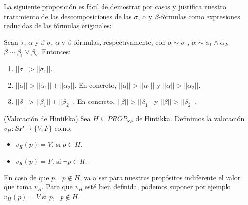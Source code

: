 La siguiente proposición es fácil de demostrar por casos y justifica nuestro tratamiento de las descomposiciones de las $\sigma$, $\alpha$ y $\beta$-fórmulas como expresiones reducidas de las fórmulas originales:

\begin{prop}\label{norma}
Sean $\sigma$, $\alpha$ y $\beta$ $\sigma$, $\alpha$ y $\beta$-fórmulas, respectivamente, con $\sigma \sim \sigma_1$, $\alpha \sim \alpha_1 \land \alpha_2$, $\beta \sim \beta_1 \lor \beta_2$. Entonces:
\begin{enumerate}
    \item $||\sigma|| > ||\sigma_1||$.
    \item $||\alpha|| > ||\alpha_1||+||\alpha_2||$. En concreto, $||\alpha||>||\alpha_1||$ y $||\alpha||>||\alpha_2||$.
    \item $||\beta|| > ||\beta_1||+||\beta_2||$. En concreto, $||\beta||>||\beta_1||$ y $||\beta||>||\beta_2||$.
\end{enumerate}
\end{prop}

\begin{definition}(Valoración de Hintikka)
Sea $H \subseteq PROP_{SP}$ de Hintikka. Definimos la valoración $v_H:SP\to\{V,F\}$ como:
\begin{itemize}
    \item $v_H(p) = V$, si $p \in H$.
    \item $v_H(p) = F$, si $\neg p \in H$.
\end{itemize}
En caso de que $p, \neg p \notin H$, va a ser para nuestros propósitos indiferente el valor que toma $v_H$. Para que $v_H$ esté bien definida, podemos suponer por ejemplo $v_H(p)=V$ si $p, \neg p \notin H$.
\end{definition}

